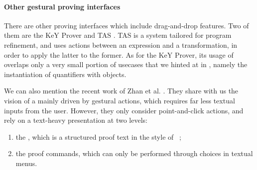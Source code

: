\begin{scope}


\paragraph{Other gestural proving interfaces}

There are other proving interfaces which include drag-and-drop features. Two of
them are the KeY Prover  and TAS
. TAS is a  system tailored for program
refinement, and uses  actions between an expression and a transformation, in
order to apply the latter to the former.
As for the KeY Prover, its usage of  overlaps only a very small portion
of usecases that we hinted at in , namely the instantiation of
quantifiers with objects.

We can also mention the recent work of Zhan et al. .
They share with us the vision of a  mainly driven by gestural
actions, which requires far less textual inputs from the user. However, they
only consider point-and-click actions, and rely on a text-heavy presentation at
two levels:
\begin{enumerate}
  \item the , which is a structured proof text in the style of
  ~;
  \item the proof commands, which can only be performed through choices in
  textual menus.
\end{enumerate}


\end{scope}
